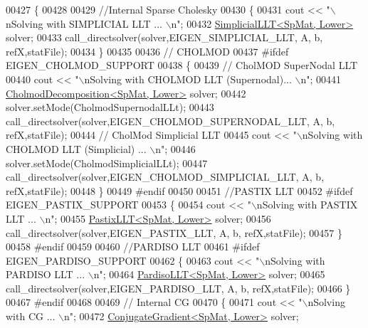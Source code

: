 \begin{DoxyCode}
00427   \{
00428     
00429     \textcolor{comment}{//Internal Sparse Cholesky}
00430     \{
00431       cout << \textcolor{stringliteral}{"\(\backslash\)nSolving with SIMPLICIAL LLT ... \(\backslash\)n"}; 
00432       \hyperlink{group___sparse_cholesky___module_class_eigen_1_1_simplicial_l_l_t}{SimplicialLLT<SpMat, Lower>} solver; 
00433       call\_directsolver(solver,EIGEN\_SIMPLICIAL\_LLT, A, b, refX,statFile); 
00434     \}
00435     
00436     \textcolor{comment}{// CHOLMOD}
00437 \textcolor{preprocessor}{    #ifdef EIGEN\_CHOLMOD\_SUPPORT}
00438     \{
00439       \textcolor{comment}{// CholMOD SuperNodal LLT}
00440       cout << \textcolor{stringliteral}{"\(\backslash\)nSolving with CHOLMOD LLT (Supernodal)... \(\backslash\)n"}; 
00441       \hyperlink{class_eigen_1_1_cholmod_decomposition}{CholmodDecomposition<SpMat, Lower>} solver;
00442       solver.setMode(CholmodSupernodalLLt);
00443        call\_directsolver(solver,EIGEN\_CHOLMOD\_SUPERNODAL\_LLT, A, b, refX,statFile);
00444       \textcolor{comment}{// CholMod Simplicial LLT}
00445       cout << \textcolor{stringliteral}{"\(\backslash\)nSolving with CHOLMOD LLT (Simplicial) ... \(\backslash\)n"}; 
00446       solver.setMode(CholmodSimplicialLLt);
00447       call\_directsolver(solver,EIGEN\_CHOLMOD\_SIMPLICIAL\_LLT, A, b, refX,statFile);
00448     \}
00449 \textcolor{preprocessor}{    #endif}
00450     
00451     \textcolor{comment}{//PASTIX LLT}
00452 \textcolor{preprocessor}{    #ifdef EIGEN\_PASTIX\_SUPPORT}
00453     \{
00454       cout << \textcolor{stringliteral}{"\(\backslash\)nSolving with PASTIX LLT ... \(\backslash\)n"}; 
00455       \hyperlink{class_eigen_1_1_pastix_l_l_t}{PastixLLT<SpMat, Lower>} solver; 
00456       call\_directsolver(solver,EIGEN\_PASTIX\_LLT, A, b, refX,statFile);
00457     \}
00458 \textcolor{preprocessor}{    #endif}
00459     
00460     \textcolor{comment}{//PARDISO LLT}
00461 \textcolor{preprocessor}{    #ifdef EIGEN\_PARDISO\_SUPPORT}
00462     \{
00463       cout << \textcolor{stringliteral}{"\(\backslash\)nSolving with PARDISO LLT ... \(\backslash\)n"}; 
00464       \hyperlink{class_eigen_1_1_pardiso_l_l_t}{PardisoLLT<SpMat, Lower>} solver; 
00465       call\_directsolver(solver,EIGEN\_PARDISO\_LLT, A, b, refX,statFile); 
00466     \}
00467 \textcolor{preprocessor}{    #endif}
00468     
00469     \textcolor{comment}{// Internal CG}
00470     \{
00471       cout << \textcolor{stringliteral}{"\(\backslash\)nSolving with CG ... \(\backslash\)n"}; 
00472       \hyperlink{group___iterative_linear_solvers___module_class_eigen_1_1_conjugate_gradient}{ConjugateGradient<SpMat, Lower>} solver; 

\end{DoxyCode}
